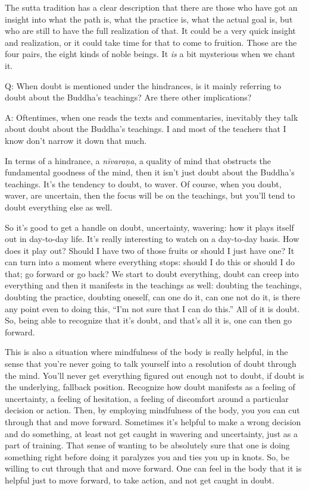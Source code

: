 The sutta tradition has a clear description that there are those who
have got an insight into what the path is, what the practice is, what
the actual goal is, but who are still to have the full realization of
that. It could be a very quick insight and realization, or it could take
time for that to come to fruition. Those are the four pairs, the eight
kinds of noble beings. It \emph{is} a bit mysterious when we chant it.

\vspace{\the\qaskip}
Q: When doubt is mentioned under the hindrances, is it mainly referring
to doubt about the Buddha’s teachings? Are there other implications?

\vspace{\the\qaskip}
A: Oftentimes, when one reads the texts and commentaries, inevitably
they talk about doubt about the Buddha’s teachings. I and most of the
teachers that I know don’t narrow it down that much.

In terms of a hindrance, a \emph{nīvaraṇa}, a quality of mind that
obstructs the fundamental goodness of the mind, then it isn’t just doubt
about the Buddha’s teachings. It’s the tendency to doubt, to waver. Of
course, when you doubt, waver, are uncertain, then the focus will be on
the teachings, but you’ll tend to doubt everything else as well.

So it’s good to get a handle on doubt, uncertainty, wavering: how it
plays itself out in day-to-day life. It’s really interesting to watch on
a day-to-day basis. How does it play out? Should I have two of those
fruits or should I just have one? It can turn into a moment where
everything stops: should I do this or should I do that; go forward or go
back? We start to doubt everything, doubt can creep into everything and
then it manifests in the teachings as well: doubting the teachings,
doubting the practice, doubting oneself, can one do it, can one not do
it, is there any point even to doing this, “I’m not sure that I can do
this.” All of it is doubt. So, being able to recognize that it’s doubt,
and that’s all it is, one can then go forward.

This is also a situation where mindfulness of the body is really
helpful, in the sense that you’re never going to talk yourself into a
resolution of doubt through the mind. You’ll never get everything
figured out enough not to doubt, if doubt is the underlying, fallback
position. Recognize how doubt manifests as a feeling of uncertainty, a
feeling of hesitation, a feeling of discomfort around a particular
decision or action. Then, by employing mindfulness of the body, you you
can cut through that and move forward. Sometimes it’s helpful to make a
wrong decision and do something, at least not get caught in wavering and
uncertainty, just as a part of training. That sense of wanting to be
absolutely sure that one is doing something right before doing it
paralyzes you and ties you up in knots. So, be willing to cut through
that and move forward. One can feel in the body that it is helpful just
to move forward, to take action, and not get caught in doubt.
